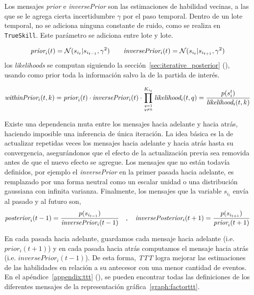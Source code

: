 \documentclass[11pt,twoside,spanish]{report} %
\newcommand\hfrac[2]{\genfrac{}{}{0pt}{}{#1}{#2}}
\begin{document}
Los mensajes \emph{prior} e \emph{inversePrior} son las estimaciones de habilidad vecinas, a las que se le agrega cierta incertidumbre $\gamma$ por el paso temporal.
Dentro de un lote temporal, no se adiciona ninguna constante de ruido, como se realiza en \texttt{TrueSkill}. 
Este par\'ametro se adiciona entre lote y lote.


\begin{equation*}
\emph{prior}_i(t) = \mathcal{N}(s_{i_t}|s_{i_{t-1}}, \gamma^2) \ \ \ \ \ \ \emph{inversePrior}_i(t) = \mathcal{N}(s_{i_t}|s_{i_{t+1}}, \gamma^2)
\end{equation*}
%
los \textit{likelihoods} se computan siguiendo la secci\'on~\ref{sec:iterative_posterior} (), usando como prior toda la informaci\'on salvo la de la partida de inter\'es.

 \begin{equation}
 \emph{withinPrior}_i(t,k) = \emph{prior}_i(t) \cdot \emph{inversePrior}_i(t) \cdot \prod_{\hfrac{q=1}{q\neq k}}^{K_{i_t}} \emph{likelihood}_i(t,q) = \frac{p(s_i^t) }{\emph{likelihood}_i(t,k)}
 \end{equation}
 
Existe una dependencia muta entre los mensajes hacia adelante y hacia atr\'as, haciendo imposible una inferencia de \'unica iteraci\'on.
La idea b\'asica es la de actualizar repetidas veces los mensajes hacia adelante y hacia atr\'as hasta su convergencia, asegur\'andonos que el efecto de la actualizaci\'on previa sea removida antes de que el nuevo efecto se agregue.
Los mensajes que no est\'an todav\'ia definidos, por ejemplo el \emph{inversePrior} en la primer pasada hacia adelante, es remplazado por una forma neutral como un escalar unidad o una distribuci\'on gaussiana con infinita varianza.
Finalmente, los mensajes que la variable $s_{i_t}$ env\'ia al pasado y al futuro son,
%
\begin{equation*}
  \emph{posterior}_i(t-1) = \frac{p(s_{i_{t-1}})}{\emph{inversePrior}_i(t-1)} \ \ \ , \ \ \ \emph{inversePosterior}_i(t+1) = \frac{p(s_{i_{t+1}})}{\emph{prior}_i(t+1)}
\end{equation*}

En cada pasada hacia adelante, guardamos cada mensaje hacia adelante (i.e. $prior_i(t+1)$) y en cada pasada hacia atr\'as computamos el mensaje hacia atr\'as (i.e. $inversePrior_i(t-1)$).
De esta forma, \textit{TTT} logra mejorar las estimaciones de las habilidades en relaci\'on a su antecesor con una menor cantidad de eventos.
En el ap\'endice~\ref{appendix:ttt} (), se pueden encontrar todas las definiciones de los diferentes mensajes de la representaci\'on gr\'afica~\ref{graph:factorttt}.
 
\end{document}
